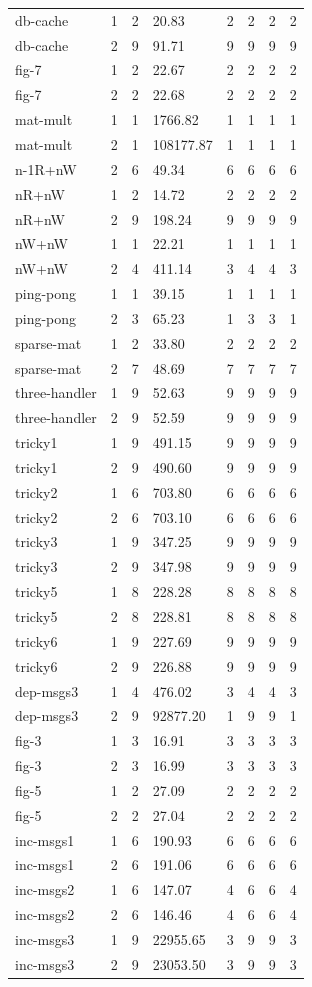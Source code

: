 \documentclass{standalone}
\begin{document}
\begin{tabular}{l l l | l | l l l l}
db-cache & 1 & 2 & 20.83 & 2 & 2 & 2 & 2\\
db-cache & 2 & 9 & 91.71 & 9 & 9 & 9 & 9\\
fig-7 & 1 & 2 & 22.67 & 2 & 2 & 2 & 2\\
fig-7 & 2 & 2 & 22.68 & 2 & 2 & 2 & 2\\
mat-mult & 1 & 1 & 1766.82 & 1 & 1 & 1 & 1\\
mat-mult & 2 & 1 & 108177.87 & 1 & 1 & 1 & 1\\
n-1R+nW & 2 & 6 & 49.34 & 6 & 6 & 6 & 6\\
nR+nW & 1 & 2 & 14.72 & 2 & 2 & 2 & 2\\
nR+nW & 2 & 9 & 198.24 & 9 & 9 & 9 & 9\\
nW+nW & 1 & 1 & 22.21 & 1 & 1 & 1 & 1\\
nW+nW & 2 & 4 & 411.14 & 3 & 4 & 4 & 3\\
ping-pong & 1 & 1 & 39.15 & 1 & 1 & 1 & 1\\
ping-pong & 2 & 3 & 65.23 & 1 & 3 & 3 & 1\\
sparse-mat & 1 & 2 & 33.80 & 2 & 2 & 2 & 2\\
sparse-mat & 2 & 7 & 48.69 & 7 & 7 & 7 & 7\\
three-handler & 1 & 9 & 52.63 & 9 & 9 & 9 & 9\\
three-handler & 2 & 9 & 52.59 & 9 & 9 & 9 & 9\\
tricky1 & 1 & 9 & 491.15 & 9 & 9 & 9 & 9\\
tricky1 & 2 & 9 & 490.60 & 9 & 9 & 9 & 9\\
tricky2 & 1 & 6 & 703.80 & 6 & 6 & 6 & 6\\
tricky2 & 2 & 6 & 703.10 & 6 & 6 & 6 & 6\\
tricky3 & 1 & 9 & 347.25 & 9 & 9 & 9 & 9\\
tricky3 & 2 & 9 & 347.98 & 9 & 9 & 9 & 9\\
tricky5 & 1 & 8 & 228.28 & 8 & 8 & 8 & 8\\
tricky5 & 2 & 8 & 228.81 & 8 & 8 & 8 & 8\\
tricky6 & 1 & 9 & 227.69 & 9 & 9 & 9 & 9\\
tricky6 & 2 & 9 & 226.88 & 9 & 9 & 9 & 9\\
dep-msgs3 & 1 & 4 & 476.02 & 3 & 4 & 4 & 3\\
dep-msgs3 & 2 & 9 & 92877.20 & 1 & 9 & 9 & 1\\
fig-3 & 1 & 3 & 16.91 & 3 & 3 & 3 & 3\\
fig-3 & 2 & 3 & 16.99 & 3 & 3 & 3 & 3\\
fig-5 & 1 & 2 & 27.09 & 2 & 2 & 2 & 2\\
fig-5 & 2 & 2 & 27.04 & 2 & 2 & 2 & 2\\
inc-msgs1 & 1 & 6 & 190.93 & 6 & 6 & 6 & 6\\
inc-msgs1 & 2 & 6 & 191.06 & 6 & 6 & 6 & 6\\
inc-msgs2 & 1 & 6 & 147.07 & 4 & 6 & 6 & 4\\
inc-msgs2 & 2 & 6 & 146.46 & 4 & 6 & 6 & 4\\
inc-msgs3 & 1 & 9 & 22955.65 & 3 & 9 & 9 & 3\\
inc-msgs3 & 2 & 9 & 23053.50 & 3 & 9 & 9 & 3\\
\end{tabular}
\end{document}
